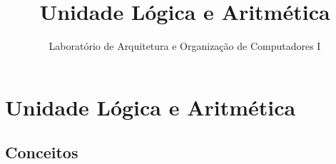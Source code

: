 

\title{Unidade Lógica e Aritmética}

\subtitle{Laboratório de Arquitetura e Organização de Computadores I} %



\begin{frame}
	\titlepage
\end{frame} 



\section{Unidade Lógica e Aritmética}

\subsection{Conceitos} 


